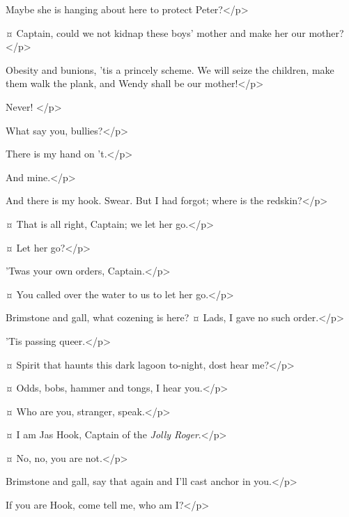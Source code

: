 \begin{drama}
\starkeyspeaks
Maybe she is hanging about here to protect Peter?</p>


\smeespeaks {}¤
Captain, could we not kidnap these boys' mother and make her our mother?</p>

\hookspeaks
Obesity and bunions, 'tis a princely scheme.
We will seize the children, make them walk the plank, and Wendy shall be our mother!</p>

\wendyspeaks
Never!
</p>

\hookspeaks
What say you, bullies?</p>

\smeespeaks
There is my hand on 't.</p>

\starkeyspeaks
And mine.</p>

\hookspeaks
And there is my hook.
Swear.
But I had forgot; where is the redskin?</p>

\smeespeaks {}¤
That is all right, Captain; we let her go.</p>

\hookspeaks {}¤
Let her go?</p>

\smeespeaks
'Twas your own orders, Captain.</p>

\starkeyspeaks {}¤
You called over the water to us to let her go.</p>

\hookspeaks
Brimstone and gall, what cozening is here?
¤
Lads, I gave no such order.</p>

\smeespeaks
'Tis passing queer.</p>

\hookspeaks {}¤
Spirit that haunts this dark lagoon to-night, dost hear me?</p>

\peterspeaks {}¤
Odds, bobs, hammer and tongs, I hear you.</p>

\hookspeaks {}¤
Who are you, stranger, speak.</p>

\peterspeaks {}¤
I am Jas Hook, Captain of the \emph{Jolly Roger}.</p>

\hookspeaks {}¤
No, no, you are not.</p>

\peterspeaks
Brimstone and gall, say that again and I'll cast anchor in you.</p>

\hookspeaks
If you are Hook, come tell me, who am I?</p>


\end{drama}
